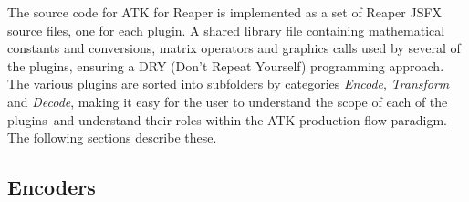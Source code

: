 \documentclass{article}
\begin{document}
The source code for ATK for Reaper is implemented as a set of Reaper JSFX source files, one for each plugin. A shared library file containing mathematical constants and conversions, matrix operators and graphics calls used by several of the plugins, ensuring a DRY (Don't Repeat Yourself) programming approach.
The various plugins are sorted into subfolders by categories \emph{Encode}, \emph{Transform} and \emph{Decode}, making it easy for the user to understand the scope of each of the plugins--and understand their roles within the ATK production flow paradigm. The following sections describe these.


\subsection{Encoders}\label{sec:encoders}

%
\end{document}
